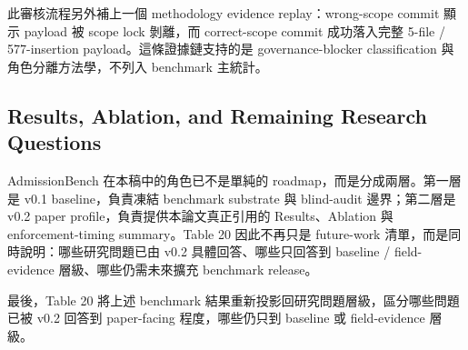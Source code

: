 \documentclass[a4paper,fontset=none]{ctexart}
\begin{document}
此審核流程另外補上一個 methodology evidence replay：wrong-scope commit \texttt{} 顯示 payload 被 scope lock 剝離，而 correct-scope commit \texttt{} 成功落入完整 5-file / 577-insertion payload。這條證據鏈支持的是 governance-blocker classification 與角色分離方法學，不列入 benchmark 主統計。

\subsection{Results, Ablation, and Remaining Research Questions}

AdmissionBench 在本稿中的角色已不是單純的 roadmap，而是分成兩層。第一層是 v0.1 baseline，負責凍結 benchmark substrate 與 blind-audit 邊界；第二層是 v0.2 paper profile，負責提供本論文真正引用的 Results、Ablation 與 enforcement-timing summary。Table 20 因此不再只是 future-work 清單，而是同時說明：哪些研究問題已由 v0.2 具體回答、哪些只回答到 baseline / field-evidence 層級、哪些仍需未來擴充 benchmark release。

最後，Table 20 將上述 benchmark 結果重新投影回研究問題層級，區分哪些問題已被 v0.2 回答到 paper-facing 程度，哪些仍只到 baseline 或 field-evidence 層級。

\smallskip{}\par\smallskip
\end{document}
